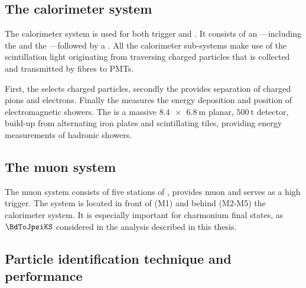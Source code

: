 \subsection{The calorimeter system}
\label{sec:lhcb_experiment:pid:calo}

The \LHCb calorimeter system is used for both trigger and \PID. It consists of
an \ECAL---including the \SPD and the \PS---followed by a \HCAL. All the
calorimeter sub-systems make use of the scintillation light originating from
traversing charged particles that is collected and transmitted by fibres to
\acp{PMT}.

First, the \SPD selects charged particles, secondly the \PS provides separation
of charged pions and electrons. Finally the \ECAL measures the energy deposition
and position of electromagnetic showers. The \HCAL is a massive
$\SI[product-units = power]{8.4 x 6.8}{\metre}$ planar, $\SI{500}{\tonne}$
detector, build-up from alternating iron plates and scintillating tiles,
providing energy measurements of hadronic showers.

\subsection{The muon system}
\label{sec:lhcb_experiment:pid:muon}

The muon system consists of five stations of \MWPC, provides muon \PID and
serves as a high \pT trigger. The system is located in front of (M1) and behind
(M2-M5) the calorimeter system. It is especially important for charmonium final
states, as $\BdToJpsiKS$ considered in the analysis described in this thesis.

\subsection{Particle identification technique and performance}

